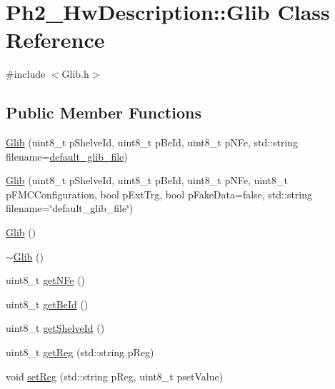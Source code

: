 \hypertarget{class_ph2___hw_description_1_1_glib}{\section{Ph2\-\_\-\-Hw\-Description\-:\-:Glib Class Reference}
\label{class_ph2___hw_description_1_1_glib}
}


{\ttfamily \#include $<$Glib.\-h$>$}

\subsection*{Public Member Functions}
\begin{DoxyCompactItemize}
\item 
\hyperlink{class_ph2___hw_description_1_1_glib_ac63dbf3825526283c7cefc5e217e1c38}{Glib} (uint8\-\_\-t p\-Shelve\-Id, uint8\-\_\-t p\-Be\-Id, uint8\-\_\-t p\-N\-Fe, std\-::string filename=\hyperlink{_glib_8h_a3b2796757992a47db4ed9462093d6fe3}{default\-\_\-glib\-\_\-file})
\item 
\hyperlink{class_ph2___hw_description_1_1_glib_a634b1c7f7831ed251e02f56922d0b673}{Glib} (uint8\-\_\-t p\-Shelve\-Id, uint8\-\_\-t p\-Be\-Id, uint8\-\_\-t p\-N\-Fe, uint8\-\_\-t p\-F\-M\-C\-Configuration, bool p\-Ext\-Trg, bool p\-Fake\-Data=false, std\-::string filename=\char`\"{}default\-\_\-glib\-\_\-file\char`\"{})
\item 
\hyperlink{class_ph2___hw_description_1_1_glib_a2d9eece9012cdc452f43895852693329}{Glib} ()
\item 
\hyperlink{class_ph2___hw_description_1_1_glib_a2fa668cf8b827199d63be060616a70cd}{$\sim$\-Glib} ()
\item 
uint8\-\_\-t \hyperlink{class_ph2___hw_description_1_1_glib_a2675c993dad690792592ba3e30036bab}{get\-N\-Fe} ()
\item 
uint8\-\_\-t \hyperlink{class_ph2___hw_description_1_1_glib_a27f5e85e68f25e56d1096306e3f70188}{get\-Be\-Id} ()
\item 
uint8\-\_\-t \hyperlink{class_ph2___hw_description_1_1_glib_ac3130c4a08d624c6d89fc66474efd6d8}{get\-Shelve\-Id} ()
\item 
uint8\-\_\-t \hyperlink{class_ph2___hw_description_1_1_glib_ade845c9d6a9fcaaac1766cf89592fb97}{get\-Reg} (std\-::string p\-Reg)
\item 
void \hyperlink{class_ph2___hw_description_1_1_glib_a017ab68372401fe244b912a5297b0c33}{set\-Reg} (std\-::string p\-Reg, uint8\-\_\-t pset\-Value)

\end{DoxyCompactItemize}
